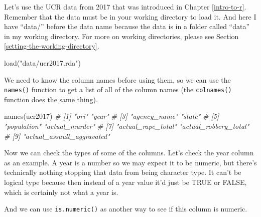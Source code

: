 \documentclass[
  a4paper,
]{krantz}
\makeatletter
\newenvironment{Shaded}{\begin{snugshade}}{\end{snugshade}}
\newcommand{\CommentTok}[1]{\textcolor[rgb]{0.37,0.37,0.37}{\textit{#1}}}
\newcommand{\FunctionTok}[1]{\textcolor[rgb]{0,0,0}{#1}}
\newcommand{\NormalTok}[1]{#1}
\newcommand{\SpecialCharTok}[1]{\textcolor[rgb]{0,0,0}{#1}}
\newcommand{\StringTok}[1]{\textcolor[rgb]{0.5,0.5,0.5}{#1}}
\newenvironment{kframe}{%
\medskip{}
\setlength{\fboxsep}{.8em}
 \def\at@end@of@kframe{}%
 \ifinner\ifhmode%
  \def\at@end@of@kframe{\end{minipage}}%
  \begin{minipage}{\columnwidth}%
 \fi\fi%
 \def\FrameCommand##1{\hskip\@totalleftmargin \hskip-\fboxsep
 \colorbox{shadecolor}{##1}\hskip-\fboxsep
     \hskip-\linewidth \hskip-\@totalleftmargin \hskip\columnwidth}%
 \MakeFramed {\advance\hsize-\width
   \@totalleftmargin\z@ \linewidth\hsize
   \@setminipage}}%
 {\par\unskip\endMakeFramed%
 \at@end@of@kframe}
\renewenvironment{Shaded}{\begin{kframe}}{\end{kframe}}
\makeatother
\begin{document}
Let's use the UCR data from 2017 that was introduced in
Chapter \ref{intro-to-r}. Remember that the data must be in
your working directory to load it. And here I have ``data/''
before the data name because the data is in a folder called
``data'' in my working directory. For more on working
directories, please see Section
\ref{setting-the-working-directory}.

\begin{Shaded}
\begin{Highlighting}[]
\FunctionTok{load}\NormalTok{(}\StringTok{"data/ucr2017.rda"}\NormalTok{)}
\end{Highlighting}
\end{Shaded}

We need to know the column names before using them, so we
can use the \texttt{names()} function to get a list of all
of the column names (the \texttt{colnames()} function does
the same thing).

\begin{Shaded}
\begin{Highlighting}[]
\FunctionTok{names}\NormalTok{(ucr2017)}
\CommentTok{\# [1] "ori"                       "year"                     }
\CommentTok{\# [3] "agency\_name"               "state"                    }
\CommentTok{\# [5] "population"                "actual\_murder"            }
\CommentTok{\# [7] "actual\_rape\_total"         "actual\_robbery\_total"     }
\CommentTok{\# [9] "actual\_assault\_aggravated"}
\end{Highlighting}
\end{Shaded}

Now we can check the types of some of the columns. Let's
check the year column as an example. A year is a number so
we may expect it to be numeric, but there's technically
nothing stopping that data from being character type. It
can't be logical type because then instead of a year value
it'd just be TRUE or FALSE, which is certainly not what a
year is.

\begin{Shaded}
\end{Shaded}

And we can use \texttt{is.numeric()} as another way to see
if this column is numeric.

\begin{Shaded}
\end{Shaded}
\end{document}
